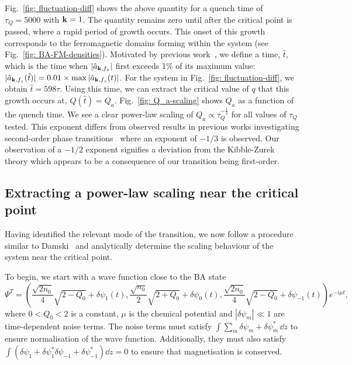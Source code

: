 Fig.~\ref{fig: fluctuation-diff} shows the above quantity for a quench time
of \(\tau_Q=5000\) with \(\vb{k}=1\).
The quantity remains zero until after the critical point is passed, where
a rapid period of growth occurs.
This onset of this growth corresponds to the ferromagnetic domains forming
within the system (see Fig.~\ref{fig: BA-FM-densities}).
Motivated by previous work~\cite{Damski2007, Qiu2020}, we define a time,
\( \hat{t} \), which is the time when \(|\hat{a}_{\vb{k}, {f_z}}|\) first
exceeds 1\% of its maximum value: \(|\hat{a}_{\vb{k}, {f_z}}(\hat{t})| =
0.01\times \max|\hat{a}_{\vb{k}, {f_z}}(t)|\).
For the system in Fig.~\ref{fig: fluctuation-diff}, we obtain
\(\hat{t}=598\tau \).
Using this time, we can extract the critical value of \( q \) that this growth
occurs at, \(Q(\hat{t}) = Q_a\).
Fig.~\ref{fig: Q_a-scaling} shows \(Q_a\) as a function of the quench time.
We see a clear power-law scaling of \(Q_a \propto \tau_Q^{-\frac{1}{2}}\) for
all values of \( \tau_Q \) tested.
This exponent differs from observed results in previous works investigating
second-order phase transitions~\cite{Damski2007, Anquez2016, Swislocki2013}
where an exponent of \(-1/3\) is observed.
Our observation of a \(-1/2\) exponent signifies a deviation from
the Kibble-Zurek theory which appears to be a consequence of our transition
being first-order.

\subsection{Extracting a power-law scaling near the critical point}
Having identified the relevant mode of the transition, we now follow a procedure
similar to Damski~\cite{Damski2007} and analytically determine the scaling
behaviour of the system near the critical point.

To begin, we start with a wave function close to the BA state
\begin{equation}\label{eq: spin-1-perturbed-BA-state}
    \Psi^T = \left(\frac{\sqrt{2n_0}}{4}\sqrt{2 - Q_0} + \delta\psi_{1}(t),
    \frac{\sqrt{n_0}}{2}\sqrt{2 + Q_0} + \delta \psi_0(t),
    \frac{\sqrt{2n_0}}{4}\sqrt{2 - Q_0} + \delta\psi_{-1}(t)\right)e^{-i\mu t},
\end{equation}
where \( 0 < Q_0 < 2 \) is a constant, \(\mu \) is the
chemical potential and \( |\delta\psi_m| \ll 1 \) are time-dependent noise
terms.
The noise terms must satisfy \(\int \sum_m\delta\psi_m+\delta\psi_m^* \, \dd z\)
to ensure normalisation of the wave function.
Additionally, they must also satisfy \(\int (\delta\psi_1 + \delta\psi_1^* 
\delta\psi_{-1} + \delta\psi_{-1}^*) \dd z = 0\) to ensure that magnetisation
is conserved.

